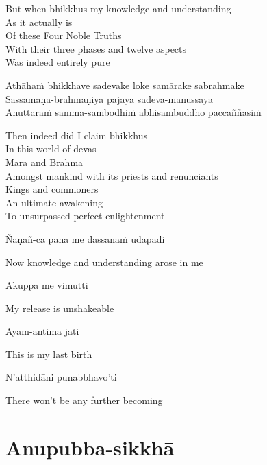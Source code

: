 \begin{english}
  But when bhikkhus my knowledge and understanding\\
  As it actually is\\
  Of these Four Noble Truths\\
  With their three phases and twelve aspects\\
  Was indeed entirely pure
\end{english}

Athāhaṁ bhikkhave sadevake loke samārake sabrahmake\\
Sassamaṇa-brāhmaṇiyā pajāya sadeva-manussāya\\
Anuttaraṁ sammā-sambodhiṁ abhisambuddho paccaññāsiṁ

\begin{english}
  Then indeed did I claim bhikkhus\\
  In this world of devas\\
  Māra and Brahmā\\
  Amongst mankind with its priests and renunciants\\
  Kings and commoners\\
  An ultimate awakening\\
  To unsurpassed perfect enlightenment
\end{english}

Ñāṇañ-ca pana me dassanaṁ udapādi

\begin{english}
  Now knowledge and understanding arose in me
\end{english}

Akuppā me vimutti

\begin{english}
  My release is unshakeable
\end{english}

Ayam-antimā jāti

\begin{english}
  This is my last birth
\end{english}

N’atthidāni punabbhavo’ti

\begin{english}
  There won’t be any further becoming
\end{english}

\suttaRef{[SN 56.11]}


\section{Anupubba-sikkhā}

